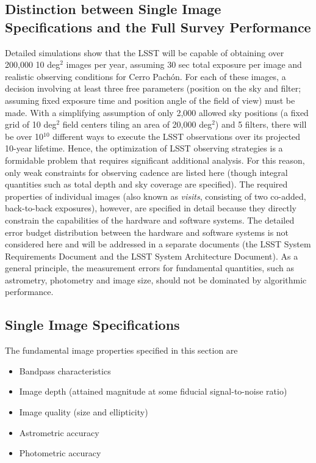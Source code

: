 \subsection{Distinction between Single Image Specifications and the
                        Full Survey Performance \label{sec:defs}}


Detailed simulations show that the LSST will be capable of obtaining over
200,000 10 deg$^2$ images per year, assuming 30 sec total exposure per
image and realistic observing conditions for Cerro Pach\'{o}n. For each of
these images, a decision involving at least three free
parameters (position on the sky and filter; assuming fixed exposure time
and position angle of the field of view) must be made. With a
simplifying assumption of only 2,000 allowed sky positions (\ie a
fixed grid of 10 deg$^2$ field centers tiling an area of 20,000 deg$^2$)
and 5 filters, there will be over 10$^{10}$ different ways to execute the
LSST observations over its projected 10-year lifetime. Hence, the
optimization of LSST observing strategies is a formidable problem that
requires significant additional analysis. For this reason, only weak
constraints for observing cadence are listed here (though integral
quantities such as total depth and sky coverage are specified).
The required properties of individual images (also known as
\textit{visits}, consisting of two co-added, back-to-back exposures), however,
are specified
in detail because they directly constrain the capabilities of the hardware
and software systems. The detailed error budget distribution between the hardware
and software systems is not considered here and will be addressed in a
separate documents (the LSST System Requirements Document and the LSST System
Architecture Document).
As a general principle, the measurement errors for fundamental quantities,
such as astrometry, photometry and image size, should not be dominated
by algorithmic performance.




\subsection{              Single Image Specifications              }
\label{singleImageSpecs}


The fundamental image properties specified in this section are
\begin{itemize}
\item Bandpass characteristics
\item Image depth (attained magnitude at some fiducial signal-to-noise ratio)
\item Image quality (size and ellipticity)
\item Astrometric accuracy
\item Photometric accuracy
\end{itemize}


